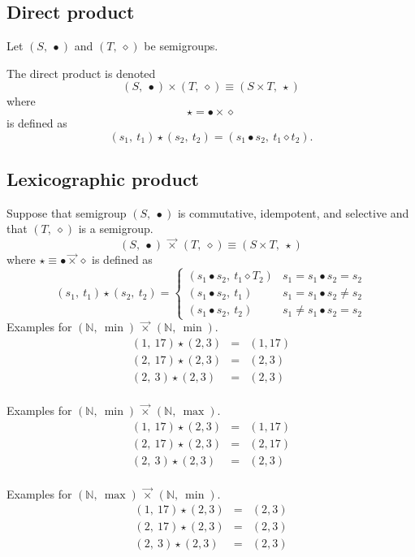 \documentclass[10pt]{report}
\newcommand{\NN}{\mathbb{N}}
\newcommand{\lexprod}{\ensuremath{\mathbin{\vec{\times}}}}
\begin{document}
\subsection{Direct product} 

Let $(S,\ \bullet)$ and $(T,\ \diamond)$ be semigroups.

The {direct product} is denoted 
\[ 
   (S,\ \bullet) \times (T,\ \diamond) \equiv (S \times T,\ \star)
\] 
where 
\[ 
\star = \bullet \times \diamond 
\] 
is defined as 
\[ 
	(s_1,\ t_1) \star (s_2,\ t_2) 
        = 
        (s_1 \bullet s_2,\  t_1 \diamond t_2).
\] 


\subsection{Lexicographic product} 

Suppose that semigroup $(S,\ \bullet)$ is commutative, idempotent, and selective 
and that $(T,\ \diamond)$ is a semigroup. 
\[
(S,\ \bullet)\ \lexprod\ (T,\ \diamond) \equiv (S \times T,\ \star)
\]
where $\star \equiv \bullet\lexprod\diamond$ is defined as 
\[
  (s_1,\ t_1) \star (s_2,\ t_2) =
        \begin{cases}
          (s_1 \bullet s_2,\ t_1 \diamond T_2)   & s_1 = s_1 \bullet s_2 = s_2 \\
          (s_1 \bullet s_2,\ t_1)                & s_1 = s_1 \bullet s_2 \neq s_2 \\
          (s_1 \bullet s_2,\ t_2)                & s_1 \neq s_1 \bullet s_2 = s_2 
        \end{cases}
\]
Examples for $(\NN,\ \min)\ \lexprod\ (\NN,\ \min)$. 
\[
\begin{array}{rcl}
(1,\ 17) \star (2, 3) & = & (1, 17) \\ 
(2,\ 17) \star (2, 3) & = & (2, 3) \\ 
(2,\ 3)  \star (2, 3) & = & (2, 3) \\ 
\end{array} 
\] 

Examples for $(\NN,\ \min)\ \lexprod\ (\NN,\ \max)$. 
\[
\begin{array}{rcl}
(1,\ 17) \star (2, 3) & = & (1, 17) \\ 
(2,\ 17) \star (2, 3) & = & (2, 17) \\ 
(2,\ 3)  \star (2, 3) & = & (2, 3) \\ 
\end{array} 
\] 

Examples for $(\NN,\ \max)\ \lexprod\ (\NN,\ \min)$. 
\[
\begin{array}{rcl}
(1,\ 17) \star (2, 3) & = & (2, 3) \\ 
(2,\ 17) \star (2, 3) & = & (2, 3) \\ 
(2,\ 3)  \star (2, 3) & = & (2, 3) \\ 
\end{array} 
\] 
\end{document}
